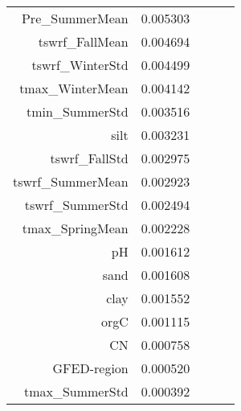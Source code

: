 \begin{table}[h]
\begin{tabular}{rrrrr}
Pre_SummerMean & 0.005303 \\
tswrf_FallMean & 0.004694 \\
tswrf_WinterStd & 0.004499 \\
tmax_WinterMean & 0.004142 \\
tmin_SummerStd & 0.003516 \\
silt & 0.003231 \\
tswrf_FallStd & 0.002975 \\
tswrf_SummerMean & 0.002923 \\
tswrf_SummerStd & 0.002494 \\
tmax_SpringMean & 0.002228 \\
pH & 0.001612 \\
sand & 0.001608 \\
clay & 0.001552 \\
orgC & 0.001115 \\
CN & 0.000758 \\
GFED-region & 0.000520 \\
tmax_SummerStd & 0.000392 \\
\bottomrule
\end{tabular}
\end{table}
